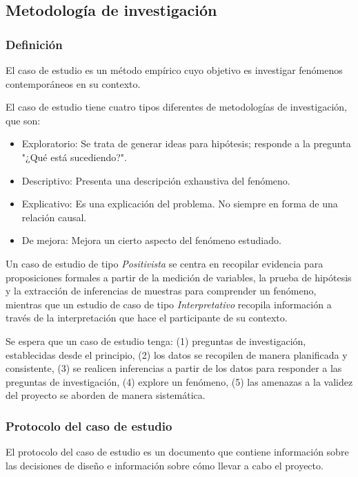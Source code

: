 \subsection{Metodología de investigación}
\subsubsection{Definición}
El caso de estudio es un método empírico cuyo objetivo es investigar fenómenos contemporáneos en su contexto.

El caso de estudio tiene cuatro tipos diferentes de metodologías de investigación, que son:
\begin{itemize}
    \item Exploratorio: Se trata de generar ideas para hipótesis; responde a la pregunta "¿Qué está sucediendo?".
    \item Descriptivo: Presenta una descripción exhaustiva del fenómeno.
    \item Explicativo: Es una explicación del problema. No siempre en forma de una relación causal.
    \item De mejora: Mejora un cierto aspecto del fenómeno estudiado.
\end{itemize}

Un caso de estudio de tipo \textit{Positivista} se centra en recopilar evidencia para proposiciones formales a partir de la medición de variables, la prueba de hipótesis y la extracción de inferencias de muestras para comprender un fenómeno, mientras que un estudio de caso de tipo \textit{Interpretativo} recopila información a través de la interpretación que hace el participante de su contexto.

Se espera que un caso de estudio tenga: (1) preguntas de investigación, establecidas desde el principio, (2) los datos se recopilen de manera planificada y consistente, (3) se realicen inferencias a partir de los datos para responder a las preguntas de investigación, (4) explore un fenómeno, (5) las amenazas a la validez del proyecto se aborden de manera sistemática.

\subsubsection{Protocolo del caso de estudio}
El protocolo del caso de estudio es un documento que contiene información sobre las decisiones de diseño e información sobre cómo llevar a cabo el proyecto.

